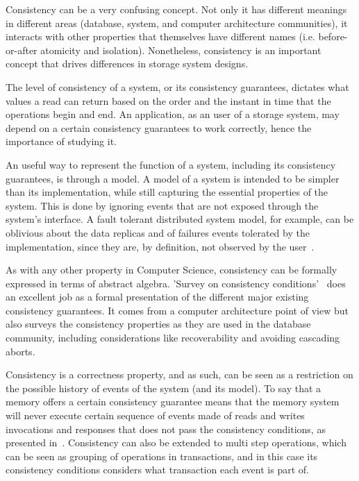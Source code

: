 \documentclass[12pt,conference]{IEEEtran}
\begin{document}
Consistency can be a very confusing concept. Not only it has different meanings in different areas (database, system, and computer architecture communities), it interacts with other properties that themselves have different names (i.e. before-or-after atomicity and isolation). Nonetheless, consistency is an important concept that drives differences in storage system designs. 

The level of consistency of a system, or its consistency guarantees, dictates what values a read can return based on the order and the instant in time that the operations begin and end. An application, as an user of a storage system, may depend on a certain consistency guarantees to work correctly, hence the importance of studying it.

An useful way to represent the function of a system, including its consistency guarantees, is through a model. A model of a system is intended to be simpler than its implementation, while still capturing the essential properties of the system. This is done by ignoring events that are not exposed through the system's interface. A fault tolerant distributed system model, for example, can be oblivious about the data replicas and of failures events tolerated by the implementation, since they are, by definition, not observed by the user~\cite{avizienis2004basic}. 

As with any other property in Computer Science, consistency can be formally expressed in terms of abstract algebra. 'Survey on consistency conditions'~\cite{dziuma2013survey} does an excellent job as a formal presentation of the different major existing consistency guarantees. It comes from a computer architecture point of view but also surveys the consistency properties as they are used in the database community, including considerations like recoverability and avoiding cascading aborts.

Consistency is a correctness property, and as such, can be seen as a restriction on the possible history of events of the system (and its model). To say that a memory offers a certain consistency guarantee means that the memory system will never execute certain sequence of events made of reads and writes invocations and responses that does not pass the consistency conditions, as presented in~\cite{dziuma2013survey}. Consistency can also be extended to multi step operations, which can be seen as grouping of operations in transactions, and in this case its consistency conditions considers what transaction each event is part of.
\end{document}

